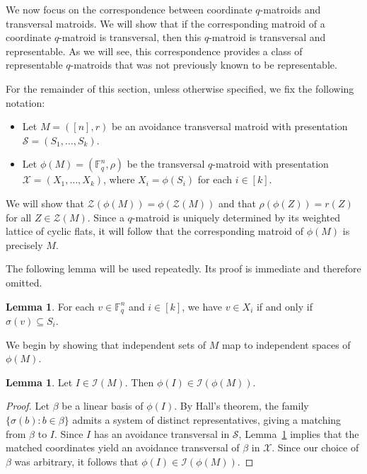 \documentclass{article}
\theoremstyle{definition}
\newtheorem{lemma}[theorem]{{{Lemma}}}
\begin{document}
We now focus on the correspondence between coordinate $q$-matroids and transversal matroids. We will show that if the corresponding matroid of a coordinate $q$-matroid is transversal, then this $q$-matroid is transversal and representable. As we will see, this correspondence provides a class of representable $q$-matroids that was not previously known to be representable.

For the remainder of this section, unless otherwise specified, we fix the following notation:
\begin{itemize}
    \item Let $M=([n],r)$ be an avoidance transversal matroid with presentation $\mathcal{S}=(S_1,\dots,S_k)$.
    \item Let $\phi(M)=(\mathbb{F}_q^n,\rho)$ be the transversal $q$-matroid with presentation $\mathcal{X}=(X_1,\dots,X_k)$, where $X_i=\phi(S_i)$ for each $i\in[k]$.
\end{itemize}

We will show that $\mathcal{Z}(\phi(M))=\phi(\mathcal{Z}(M))$ and that $\rho(\phi(Z))=r(Z)$ for all $Z\in\mathcal{Z}(M)$. Since a $q$-matroid is uniquely determined by its weighted lattice of cyclic flats, it will follow that the corresponding matroid of $\phi(M)$ is precisely $M$.

The following lemma will be used repeatedly. Its proof is immediate and therefore omitted.

\begin{lemma}\label{lem:vector_to_support_containment}
    For each $v\in\mathbb{F}_q^n$ and $i\in[k]$, we have $v\in X_i$ if and only if $\sigma(v)\subseteq S_i$.
\end{lemma}

We begin by showing that independent sets of $M$ map to independent spaces of $\phi(M)$.

\begin{lemma}\label{lem:indep_to_indep}
    Let $I\in\mathcal{I}(M)$. Then $\phi(I)\in\mathcal{I}(\phi(M))$.
\end{lemma}

\begin{proof}
    Let $\beta$ be a linear basis of $\phi(I)$. By Hall's theorem, the family $\{\sigma(b):b\in\beta\}$ admits a system of distinct representatives, giving a matching from $\beta$ to $I$. Since $I$ has an avoidance transversal in $\mathcal{S}$, Lemma~\ref{lem:vector_to_support_containment} implies that the matched coordinates yield an avoidance transversal of $\beta$ in $\mathcal{X}$. Since our choice of $\beta$ was arbitrary, it follows that $\phi(I)\in\mathcal{I}(\phi(M))$.
\end{proof}
\end{document}
